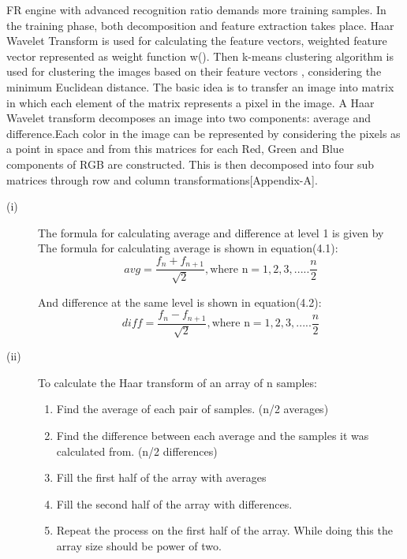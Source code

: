   \vspace*{1pc}
FR engine with advanced recognition ratio demands more training samples. In the training phase, both decomposition and feature extraction takes place. Haar Wavelet Transform is used for calculating the feature vectors, weighted feature vector represented as weight function w(). Then k-means clustering algorithm is used for clustering the images based on their feature vectors , considering the minimum Euclidean distance. The basic idea is to transfer an image into matrix in which each element of the matrix represents a pixel in the image. A Haar Wavelet transform decomposes an image into two components: average and difference.Each color in the image can be represented by considering the pixels as a point in space and from this matrices for each Red, Green and Blue components of RGB are constructed. This is then decomposed into four sub matrices through row and column transformations[Appendix-A].
\begin{description}
\item[(i)]  The formula for calculating average and difference at level 1 is given by
The formula for calculating average is shown in equation(4.1):
\begin{equation}\label{}
avg = \frac{f_n+f_{n+1}}{\sqrt{2}}, \text{where n} = 1,2,3,.....\frac{n}{2}
\end{equation}

And difference at the same level is shown in equation(4.2):
\begin{equation}\label{}
diff = \frac{f_n-f_{n+1}}{\sqrt{2}},\text{where n}=1,2,3,.....\frac{n}{2} 
\end{equation}

\item[(ii)]To calculate the Haar transform of an array of n samples: 
       \begin{enumerate}
 \item Find the average of each pair of samples. (n/2 averages) 
 \item  Find the difference between each average and the samples it was calculated from. (n/2 differences) 
 \item  Fill the first half of the array with averages 
 \item  Fill the second half of the array with differences. 
 \item Repeat the process on the first half of the array. While doing this the array size should be power of two.
\end{enumerate}
\end{description} 

